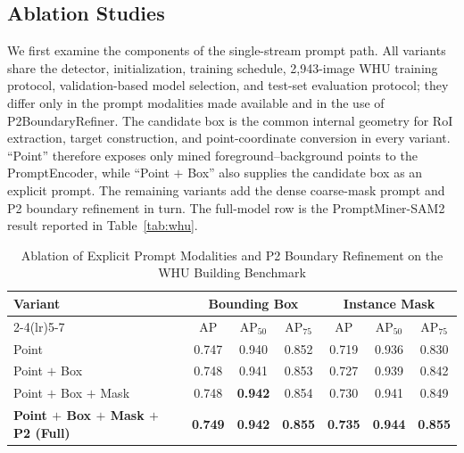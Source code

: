 \documentclass[letterpaper,journal]{IEEEtran}
\begin{document}
\subsection{Ablation Studies}
\label{sec:ablations}
We first examine the components of the single-stream prompt path. All variants share the
detector, initialization, training schedule, 2,943-image WHU training protocol,
validation-based model selection, and test-set evaluation protocol; they differ only in the
prompt modalities made available and in the use of P2BoundaryRefiner. The candidate box is the
common internal geometry for RoI extraction, target construction, and point-coordinate
conversion in every variant. ``Point'' therefore exposes only mined foreground--background
points to the PromptEncoder, while ``Point $+$ Box'' also supplies the candidate box as an
explicit prompt. The remaining variants add the dense coarse-mask prompt and P2 boundary
refinement in turn. The full-model row is the PromptMiner-SAM2 result reported in
Table~\ref{tab:whu}.

\begin{table}[!t]
\caption{Ablation of Explicit Prompt Modalities and P2 Boundary Refinement on the WHU Building Benchmark}
\label{tab:single_ablation}
\centering
\footnotesize
\begin{tabular}{lcccccc}
\toprule
\multirow{2}{*}{Variant} & \multicolumn{3}{c}{Bounding Box} & \multicolumn{3}{c}{Instance Mask} \\
\cmidrule(lr){2-4}\cmidrule(lr){5-7}
& AP & AP$_{50}$ & AP$_{75}$ & AP & AP$_{50}$ & AP$_{75}$ \\
\midrule
Point & 0.747 & 0.940 & 0.852 & 0.719 & 0.936 & 0.830 \\
Point $+$ Box & 0.748 & 0.941 & 0.853 & 0.727 & 0.939 & 0.842 \\
Point $+$ Box $+$ Mask & 0.748 & \textbf{0.942} & 0.854 & 0.730 & 0.941 & 0.849 \\
\textbf{Point $+$ Box $+$ Mask $+$ P2 (Full)} & \textbf{0.749} & \textbf{0.942} & \textbf{0.855} & \textbf{0.735} & \textbf{0.944} & \textbf{0.855} \\
\bottomrule
\end{tabular}
\end{table}
\end{document}
